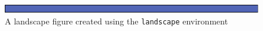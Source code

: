 \documentclass{article}
\begin{document}
\begin{landscape}
  \begin{figure}[htbp]
  \includegraphics[width=8in]{box.pdf}
  \caption{A landscape figure created using the \texttt{landscape} environment}
  \end{figure}
\end{landscape}
\end{document}

